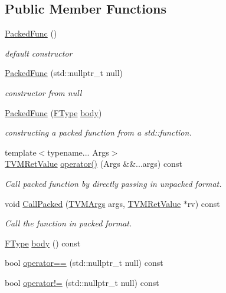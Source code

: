 \subsection*{Public Member Functions}
\begin{DoxyCompactItemize}
\item 
\hyperlink{classtvm_1_1runtime_1_1PackedFunc_ac04ed1678799ef2f0d22204edddcdb41}{Packed\+Func} ()
\begin{DoxyCompactList}\small\item\em default constructor \end{DoxyCompactList}\item 
\hyperlink{classtvm_1_1runtime_1_1PackedFunc_afde7eaa98f6cb12c7e80da16e859c210}{Packed\+Func} (std\+::nullptr\+\_\+t null)
\begin{DoxyCompactList}\small\item\em constructor from null \end{DoxyCompactList}\item 
\hyperlink{classtvm_1_1runtime_1_1PackedFunc_a66c99486332437e0459429dd00db2710}{Packed\+Func} (\hyperlink{classtvm_1_1runtime_1_1PackedFunc_ae5f951a6a515f3e3a7493c27704b7849}{F\+Type} \hyperlink{classtvm_1_1runtime_1_1PackedFunc_a14fb895cbdceecbe566588b7467dafc3}{body})
\begin{DoxyCompactList}\small\item\em constructing a packed function from a std\+::function. \end{DoxyCompactList}\item 
{\footnotesize template$<$typename... Args$>$ }\\\hyperlink{classtvm_1_1runtime_1_1TVMRetValue}{T\+V\+M\+Ret\+Value} \hyperlink{classtvm_1_1runtime_1_1PackedFunc_a4e0c70245a080d914946285ff3ebc0d7}{operator()} (Args \&\&...args) const 
\begin{DoxyCompactList}\small\item\em Call packed function by directly passing in unpacked format. \end{DoxyCompactList}\item 
void \hyperlink{classtvm_1_1runtime_1_1PackedFunc_aa90598e3e64b32de7ebfc5e09208afa4}{Call\+Packed} (\hyperlink{classtvm_1_1runtime_1_1TVMArgs}{T\+V\+M\+Args} args, \hyperlink{classtvm_1_1runtime_1_1TVMRetValue}{T\+V\+M\+Ret\+Value} $\ast$rv) const 
\begin{DoxyCompactList}\small\item\em Call the function in packed format. \end{DoxyCompactList}\item 
\hyperlink{classtvm_1_1runtime_1_1PackedFunc_ae5f951a6a515f3e3a7493c27704b7849}{F\+Type} \hyperlink{classtvm_1_1runtime_1_1PackedFunc_a14fb895cbdceecbe566588b7467dafc3}{body} () const 
\item 
bool \hyperlink{classtvm_1_1runtime_1_1PackedFunc_acfc585ee6554c18706fcfe89d3c6df87}{operator==} (std\+::nullptr\+\_\+t null) const 
\item 
bool \hyperlink{classtvm_1_1runtime_1_1PackedFunc_ad70b44cf7f2719f1e91fe7c865790865}{operator!=} (std\+::nullptr\+\_\+t null) const 
\end{DoxyCompactItemize}



